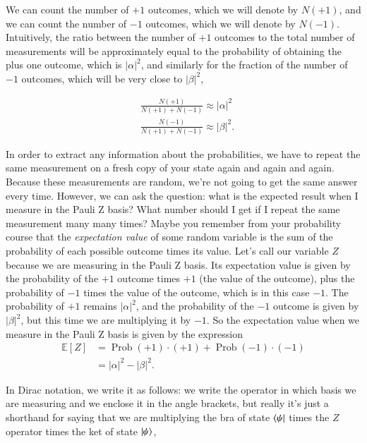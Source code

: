 We can count the number of $+1$ outcomes, which we will denote by $N(+1)$, and we can count the number of $-1$ outcomes, which we will denote by $N(-1)$. Intuitively, the ratio between the number of $+1$ outcomes to the total number of measurements will be approximately equal to the probability of obtaining the plus one outcome, which is $|\alpha|^2$, and similarly for the fraction of the number of $-1$ outcomes, which will be very close to $|\beta|^2$,

\begin{equation}
\begin{aligned}
&\frac{N(+1)}{N(+1)+N(-1)} \approx|\alpha|^{2} \\
&\frac{N(-1)}{N(+1)+N(-1)} \approx|\beta|^{2}.
\end{aligned}
\end{equation}

In order to extract any information about the probabilities, we have to repeat the same measurement on a fresh copy of your state again and again and again. Because these measurements are random, we're not going to get the same answer every time. However, we can ask the question: what is the expected result when I measure in the Pauli Z basis? What number should I get if I repeat the same measurement many many times? Maybe you remember from your probability course that the \emph{expectation value} of some random variable is the sum of the probability of each possible outcome times its value. Let's call our variable $Z$ because we are measuring in the Pauli Z basis.  Its expectation value is given by the probability of the $+1$ outcome times $+1$ (the value of the outcome), plus the probability of $-1$ times the value of the outcome, which is in this case $-1$.  The probability of $+1$ remains $|\alpha|^2$, and the probability of the $-1$ outcome is given by $|\beta|^2$, but this time we are multiplying it by $-1$. So the expectation value when we measure in the Pauli Z basis is given by the expression
\begin{equation}
\begin{aligned}
\mathbb{E}[Z] &=\operatorname{Prob}(+1) \cdot(+1)+\operatorname{Prob}(-1) \cdot(-1) \\
&=|\alpha|^{2}-|\beta|^{2}.
\end{aligned}
\end{equation}

In Dirac notation, we write it as follows: we write the operator in which basis we are measuring and we enclose it in the angle brackets, but really it's just a shorthand for saying that we are multiplying the bra of state $\left\langle \psi \right|$ times the $Z$ operator times the ket of state $\left| \psi \right\rangle$,

